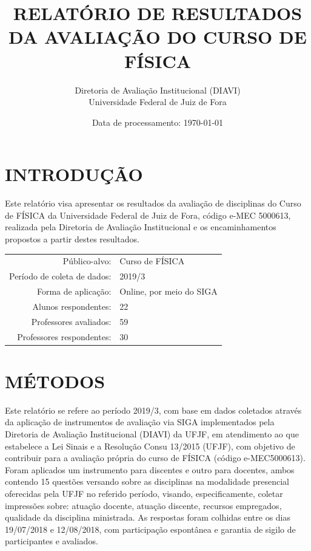 \documentclass[a4paper,10pt]{article}
\date{Data de processamento: \today}
\begin{document}
\author{Diretoria de Avaliação Institucional (DIAVI) \\ Universidade Federal de Juiz de Fora}

\title{RELATÓRIO DE RESULTADOS DA AVALIAÇÃO DO CURSO DE FÍSICA}
\maketitle
\section{INTRODUÇÃO}
Este relatório visa apresentar os resultados da avaliação de disciplinas do Curso     de FÍSICA da Universidade Federal de Juiz de Fora, código e-MEC 5000613, realizada pela     Diretoria de Avaliação Institucional e os encaminhamentos propostos a     partir destes resultados.

\begin{center}
\begin{tabularx}{\linewidth}{r|X}

Público-alvo:& Curso de FÍSICA\\

Período de coleta de dados:& 2019/3 \\

Forma de aplicação:& Online, por meio do SIGA\\

Alunos respondentes:& 22\\

Professores avaliados:& 59\\

Professores respondentes:& 30\\
\end{tabularx}
\end{center}

\section{MÉTODOS}
Este relatório se refere ao período 2019/3, com base em dados     coletados através da aplicação de instrumentos de avaliação via SIGA     implementados pela Diretoria de Avaliação Institucional (DIAVI) da UFJF, em atendimento     ao que estabelece a Lei Sinais e a Resolução Consu 13/2015 (UFJF),     com objetivo de contribuir para a avaliação própria do curso de FÍSICA (código e-MEC5000613). Foram aplicados um instrumento para discentes e outro para docentes, ambos contendo     15 questões versando sobre as disciplinas na modalidade presencial oferecidas pela UFJF no     referido período, visando, especificamente, coletar impressões sobre: atuação docente, atuação discente,     recursos empregados, qualidade da disciplina ministrada.     As respostas foram colhidas entre os dias 19/07/2018 e 12/08/2018, com participação espontânea e garantia de    sigilo de participantes e avaliados.
\end{document}
